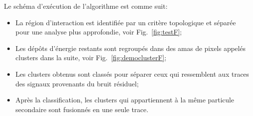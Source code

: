 Le schéma d'exécution de l'algorithme est comme suit:
\begin{itemize}
	\item La région d'interaction est identifiée par un critère topologique et séparée pour une analyse plus approfondie, voir Fig.~\ref{fig:testF};
	\item Les dépôts d'énergie restants sont regroupés dans des amas de pixels appelés  clusters dans la suite, voir Fig.~\ref{fig:democlusterF};
	\item Les clusters obtenus sont classés pour séparer ceux qui ressemblent aux traces des signaux provenants du bruit résiduel; 
	\item Après la classification, les clusters qui appartiennent à la même particule secondaire   sont fusionnés en une seule trace.
	
\end{itemize}
